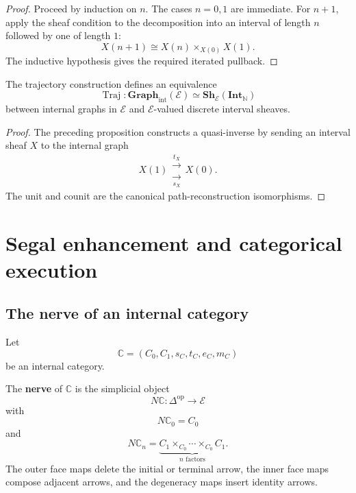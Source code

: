 \begin{proof}
Proceed by induction on \(n\). The cases \(n=0,1\) are immediate. For
\(n+1\), apply the sheaf condition to the decomposition into an interval of
length \(n\) followed by one of length \(1\):
\[
    X(n+1)\cong X(n)\times_{X(0)}X(1).
\]
The inductive hypothesis gives the required iterated pullback.
\end{proof}

\begin{theorem}
\label{thm:internal-graph-interval-sheaf-equivalence}
The trajectory construction defines an equivalence
\[
    \operatorname{Traj}:
    \mathbf{Graph}_{\mathrm{int}}(\mathcal E)
    \simeq
    \mathbf{Sh}_{\mathcal E}(\mathbf{Int}_{\mathbb N})
\]
between internal graphs in \(\mathcal E\) and
\(\mathcal E\)-valued discrete interval sheaves.
\end{theorem}

\begin{proof}
The preceding proposition constructs a quasi-inverse by sending an interval
sheaf \(X\) to the internal graph
\[
    X(1)
    \mathrel{\substack{\xrightarrow{t_X}\\[-0.4em]\xrightarrow[s_X]{}}}
    X(0).
\]
The unit and counit are the canonical path-reconstruction isomorphisms.
\end{proof}

\section{Segal enhancement and categorical execution}
\label{sec:segal-enhancement-categorical-execution}

\subsection{The nerve of an internal category}
\label{subsec:nerve-internal-category}

Let
\[
    \mathbb C=(C_0,C_1,s_C,t_C,e_C,m_C)
\]
be an internal category.

\begin{definition}
\label{def:internal-nerve}
The \textbf{nerve} of \(\mathbb C\) is the simplicial object
\[
    N\mathbb C:\Delta^{\mathrm{op}}\to\mathcal E
\]
with
\[
    N\mathbb C_0=C_0
\]
and
\[
    N\mathbb C_n
    =
    \underbrace{
    C_1\times_{C_0}\cdots\times_{C_0}C_1
    }_{n\text{ factors}}.
\]
The outer face maps delete the initial or terminal arrow, the inner face maps
compose adjacent arrows, and the degeneracy maps insert identity arrows.
\end{definition}

